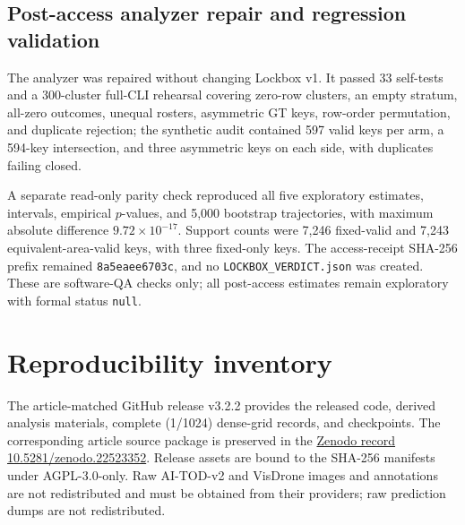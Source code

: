 \documentclass[preprint,10pt]{elsarticle}
\begin{document}
\subsection{Post-access analyzer repair and regression validation}

The analyzer was repaired without changing Lockbox v1. It passed 33 self-tests and a 300-cluster full-CLI rehearsal covering zero-row clusters, an empty stratum, all-zero outcomes, unequal rosters, asymmetric GT keys, row-order permutation, and duplicate rejection; the synthetic audit contained 597 valid keys per arm, a 594-key intersection, and three asymmetric keys on each side, with duplicates failing closed.

A separate read-only parity check reproduced all five exploratory estimates, intervals, empirical $p$-values, and 5,000 bootstrap trajectories, with maximum absolute difference $9.72\times10^{-17}$. Support counts were 7,246 fixed-valid and 7,243 equivalent-area-valid keys, with three fixed-only keys. The access-receipt SHA-256 prefix remained \texttt{8a5eaee6703c}, and no \texttt{LOCKBOX\_VERDICT.json} was created. These are software-QA checks only; all post-access estimates remain exploratory with formal status \texttt{null}.

\section{Reproducibility inventory}

The article-matched GitHub release v3.2.2 provides the released code, derived analysis materials, complete (1/1024) dense-grid records, and checkpoints. The corresponding article source package is preserved in the \href{https://doi.org/10.5281/zenodo.22523352}{Zenodo record 10.5281/zenodo.22523352}. Release assets are bound to the SHA-256 manifests under AGPL-3.0-only. Raw AI-TOD-v2 and VisDrone images and annotations are not redistributed and must be obtained from their providers; raw prediction dumps are not redistributed.
\end{document}
